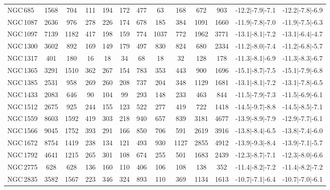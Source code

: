 \begin{table*}
\begin{center}
\begin{tabular}{lcccccccccccc}
NGC\,685 & 1568 & 704 & 111 & 194 & 172 & 477 & 63 & 168 & 672 & 903 & -12.2$\vert$-7.9$\vert$-7.1 & -12.2$\vert$-7.8$\vert$-6.9 \\ 
NGC\,1087 & 2636 & 976 & 278 & 226 & 174 & 678 & 185 & 384 & 1091 & 1660 & -11.9$\vert$-7.8$\vert$-7.0 & -11.9$\vert$-7.5$\vert$-6.3 \\ 
NGC\,1097 & 7139 & 1182 & 417 & 198 & 159 & 774 & 1037 & 772 & 1962 & 3771 & -13.1$\vert$-8.1$\vert$-7.2 & -13.1$\vert$-6.4$\vert$-4.7 \\ 
NGC\,1300 & 3602 & 892 & 169 & 149 & 179 & 497 & 830 & 824 & 680 & 2334 & -11.2$\vert$-8.0$\vert$-7.4 & -11.2$\vert$-6.8$\vert$-5.7 \\ 
NGC\,1317 & 401 & 180 & 16 & 18 & 34 & 68 & 18 & 32 & 128 & 178 & -11.3$\vert$-8.1$\vert$-6.9 & -11.3$\vert$-8.3$\vert$-6.7 \\ 
NGC\,1365 & 3291 & 1510 & 362 & 267 & 154 & 783 & 353 & 443 & 900 & 1696 & -15.1$\vert$-8.7$\vert$-7.5 & -15.1$\vert$-7.9$\vert$-6.8 \\ 
NGC\,1385 & 2531 & 958 & 269 & 260 & 208 & 737 & 204 & 348 & 1129 & 1681 & -13.1$\vert$-8.1$\vert$-7.2 & -13.1$\vert$-7.8$\vert$-6.5 \\ 
NGC\,1433 & 2083 & 646 & 90 & 104 & 99 & 293 & 148 & 233 & 463 & 844 & -11.5$\vert$-7.9$\vert$-7.3 & -11.5$\vert$-6.9$\vert$-6.1 \\ 
NGC\,1512 & 2675 & 925 & 244 & 155 & 123 & 522 & 277 & 419 & 722 & 1418 & -14.5$\vert$-9.7$\vert$-8.8 & -14.5$\vert$-8.5$\vert$-7.1 \\ 
NGC\,1559 & 8603 & 1592 & 419 & 303 & 218 & 940 & 657 & 839 & 3181 & 4677 & -13.9$\vert$-8.9$\vert$-7.9 & -12.9$\vert$-7.7$\vert$-6.1 \\ 
NGC\,1566 & 9045 & 1752 & 393 & 291 & 166 & 850 & 706 & 591 & 2619 & 3916 & -13.8$\vert$-8.4$\vert$-6.5 & -13.8$\vert$-7.4$\vert$-6.0 \\ 
NGC\,1672 & 8754 & 1419 & 238 & 134 & 121 & 493 & 930 & 1127 & 2855 & 4912 & -13.9$\vert$-9.3$\vert$-8.4 & -13.9$\vert$-7.1$\vert$-5.7 \\ 
NGC\,1792 & 4641 & 1215 & 265 & 301 & 108 & 674 & 255 & 501 & 1683 & 2439 & -12.3$\vert$-8.7$\vert$-7.1 & -12.3$\vert$-8.0$\vert$-6.6 \\ 
NGC\,2775 & 628 & 628 & 136 & 160 & 110 & 406 & 106 & 108 & 138 & 352 & -11.4$\vert$-8.2$\vert$-7.2 & -11.4$\vert$-8.2$\vert$-7.2 \\ 
NGC\,2835 & 3582 & 1567 & 223 & 346 & 324 & 893 & 110 & 369 & 1134 & 1613 & -10.7$\vert$-7.1$\vert$-6.4 & -10.7$\vert$-7.0$\vert$-6.1 \\ 

\end{tabular}
\end{center}
\end{table*}
